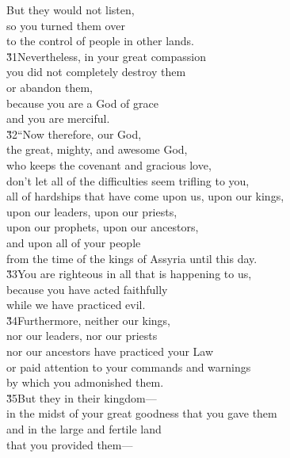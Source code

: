 \begin{poetry}
\poeml But they would not listen, \\
\poemll    so you turned them over \\
\poemlll       to the control of people in other lands. \\
\poeml \v{31}Nevertheless, in your great compassion \\
\poemll    you did not completely destroy them \\
\poemlll       or abandon them, \\
\poeml because you are a God of grace \\
\poemll    and you are merciful. \\
\poeml \v{32}``Now therefore, our God, \\
\poemll    the great, mighty, and awesome God, \\
\poemlll       who keeps the covenant and gracious love, \\
\poeml don't let all of the difficulties seem trifling to you, \\
\poemll    all of hardships that have come upon us, upon our kings, \\
\poeml upon our leaders, upon our priests, \\
\poemll    upon our prophets, upon our ancestors, \\
\poeml and upon all of your people \\
\poemll    from the time of the kings of Assyria until this day. \\
\poeml \v{33}You are righteous in all that is happening to us, \\
\poemll    because you have acted faithfully \\
\poemlll       while we have practiced evil. \\
\poeml \v{34}Furthermore, neither our kings, \\
\poemll    nor our leaders, nor our priests \\
\poemlll       nor our ancestors have practiced your Law \\
\poeml or paid attention to your commands and warnings \\
\poemll    by which you admonished them. \\
\poeml \v{35}But they in their kingdom--- \\
\poemll    in the midst of your great goodness that you gave them \\
\poeml and in the large and fertile land \\
\poemll    that you provided them--- \\

\end{poetry}
